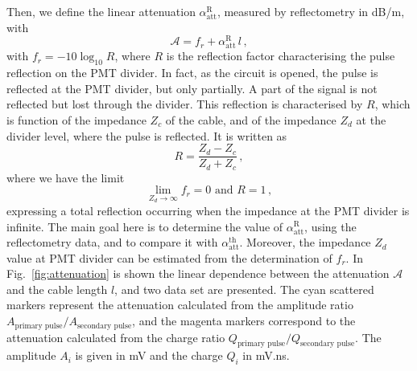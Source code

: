 Then, we define the linear attenuation $\alpha_{\text{att}}^{\text{R}}$, measured by reflectometry in dB/m, with
\begin{equation}
  \mathcal{A} = f_{r}+\alpha_{\text{att}}^{\text{R}}\,l\,,
\end{equation}
with $f_{r} = -10\log_{10}R$, where $R$ is the reflection factor characterising the pulse reflection on the PMT divider.
In fact, as the circuit is opened, the pulse is reflected at the PMT divider, but only partially.
A part of the signal is not reflected but lost through the divider.
This reflection is characterised by $R$, which is function of the impedance $Z_{c}$ of the cable, and of the impedance $Z_{d}$ at the divider level, where the pulse is reflected.
It is written as
\begin{equation}
  R = \frac{Z_{d}-Z_{c}}{Z_{d}+Z_{c}}\,,
\end{equation}
where we have the limit
\begin{equation}
  \lim_{Z_{d} \to \infty} f_{r} = 0 \text{ and } R=1\,,
\end{equation}
expressing a total reflection occurring when the impedance at the PMT divider is infinite.
The main goal here is to determine the value of $\alpha_{\text{att}}^{\text{R}}$, using the reflectometry data, and to compare it with $\alpha_{\text{att}}^{\text{th}}$.
Moreover, the impedance $Z_{d}$ value at PMT divider can be estimated from the determination of $f_{r}$.
In Fig.~\ref{fig:attenuation} is shown the linear dependence between the attenuation $\mathcal{A}$ and the cable length $l$, and two data set are presented.
The cyan scattered markers represent the attenuation calculated from the amplitude ratio $A_{\text{primary pulse}}/A_{\text{secondary pulse}}$, and the magenta markers correspond to the attenuation calculated from the charge ratio $Q_{\text{primary pulse}}/Q_{\text{secondary pulse}}$.
The amplitude $A_{i}$ is given in mV and the charge $Q_{i}$ in mV.ns.
